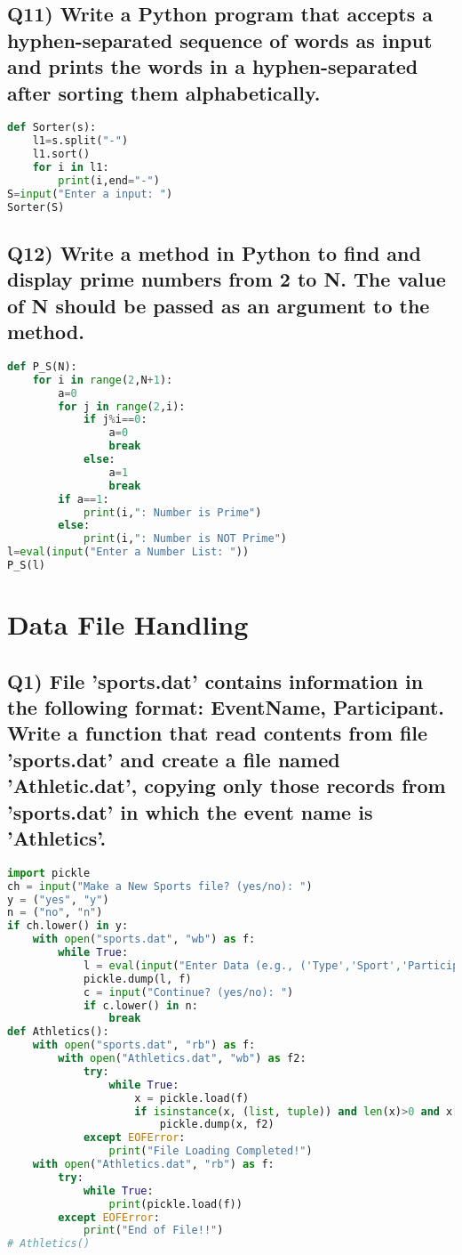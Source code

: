 \documentclass{article}
\begin{document}
\subsection*{Q11) Write a Python program that accepts a hyphen-separated sequence of words as input and prints the words in a hyphen-separated after sorting them alphabetically.}
\begin{lstlisting}[language=Python]
def Sorter(s):
    l1=s.split("-")
    l1.sort()
    for i in l1:
        print(i,end="-")
S=input("Enter a input: ")
Sorter(S)
\end{lstlisting}

\subsection*{Q12) Write a method in Python to find and display prime numbers from 2 to N. The value of N should be passed as an argument to the method.}
\begin{lstlisting}[language=Python]
def P_S(N):
    for i in range(2,N+1):
        a=0
        for j in range(2,i):
            if j%i==0:
                a=0
                break
            else:
                a=1
                break
        if a==1:
            print(i,": Number is Prime")
        else:
            print(i,": Number is NOT Prime")
l=eval(input("Enter a Number List: "))
P_S(l)
\end{lstlisting}

\section{Data File Handling}

\subsection*{Q1) File 'sports.dat' contains information in the following format: EventName, Participant. Write a function that read contents from file 'sports.dat' and create a file named 'Athletic.dat', copying only those records from 'sports.dat' in which the event name is 'Athletics'.}
\begin{lstlisting}[language=Python]
import pickle
ch = input("Make a New Sports file? (yes/no): ")
y = ("yes", "y")
n = ("no", "n")
if ch.lower() in y:
    with open("sports.dat", "wb") as f:
        while True:
            l = eval(input("Enter Data (e.g., ('Type','Sport','Participant')): "))
            pickle.dump(l, f)
            c = input("Continue? (yes/no): ")
            if c.lower() in n:
                break
def Athletics():
    with open("sports.dat", "rb") as f:
        with open("Athletics.dat", "wb") as f2:
            try:
                while True:
                    x = pickle.load(f)
                    if isinstance(x, (list, tuple)) and len(x)>0 and x[0].lower() == "athletics":
                        pickle.dump(x, f2)
            except EOFError:
                print("File Loading Completed!")
    with open("Athletics.dat", "rb") as f:
        try:
            while True:
                print(pickle.load(f))
        except EOFError:
            print("End of File!!")
# Athletics()
\end{lstlisting}
\end{document}
